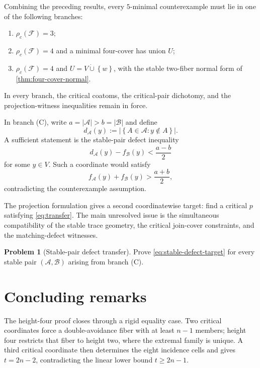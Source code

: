 \documentclass[11pt,reqno]{amsart}
\numberwithin{equation}{section}
\theoremstyle{definition}
\newtheorem{problem}[problem]{Problem}
\theoremstyle{remark}
\newcommand{\F}{\mathcal{F}}
\newcommand{\A}{\mathcal{A}}
\newcommand{\1}{\mathbf{1}}
\newcommand{\set}[1]{\left\{#1\right\}}
\newcommand{\abs}[1]{\left|#1\right|}
\begin{document}
Combining the preceding results, every \(5\)-minimal counterexample must lie in one of the following branches:
\begin{enumerate}[label=\textup{(\Alph*)},leftmargin=2.6em]
\item \(\rho_c(\F)=3\);
\item \(\rho_c(\F)=4\) and a minimal four-cover has union \(U\);
\item \(\rho_c(\F)=4\) and \(U=V\mathbin{\dot\cup}\set{w}\), with the stable two-fiber normal form of \cref{thm:four-cover-normal}.
\end{enumerate}
In every branch, the critical coatoms, the critical-pair dichotomy, and the projection-witness inequalities remain in force.

In branch \textup{(C)}, write
\(
a=\abs\A>b=\abs{\mathcal B}
\)
and define
\[
d_{\A}(y):=\abs{\set{A\in\A:y\notin A}}.
\]
A sufficient statement is the stable-pair defect inequality
\begin{equation}\label{eq:stable-defect-target}
d_{\A}(y)-f_{\mathcal B}(y)
<\frac{a-b}{2}
\end{equation}
for some \(y\in V\).  Such a coordinate would satisfy
\[
f_{\A}(y)+f_{\mathcal B}(y)
>\frac{a+b}{2},
\]
contradicting the counterexample assumption.

The projection formulation gives a second coordinatewise target: find a critical \(p\) satisfying \cref{eq:transfer}.  The main unresolved issue is the simultaneous compatibility of the stable trace geometry, the critical join-cover constraints, and the matching-defect witnesses.

\begin{problem}[Stable-pair defect transfer]\label{prob:stable-defect}
Prove \cref{eq:stable-defect-target} for every stable pair \((\A,\mathcal B)\) arising from branch \textup{(C)}.
\end{problem}

\section{Concluding remarks}

The height-four proof closes through a rigid equality case.  Two critical coordinates force a double-avoidance fiber with at least \(n-1\) members; height four restricts that fiber to height two, where the extremal family is unique.  A third critical coordinate then determines the eight incidence cells and gives \(t=2n-2\), contradicting the linear lower bound \(t\ge2n-1\).
\end{document}
